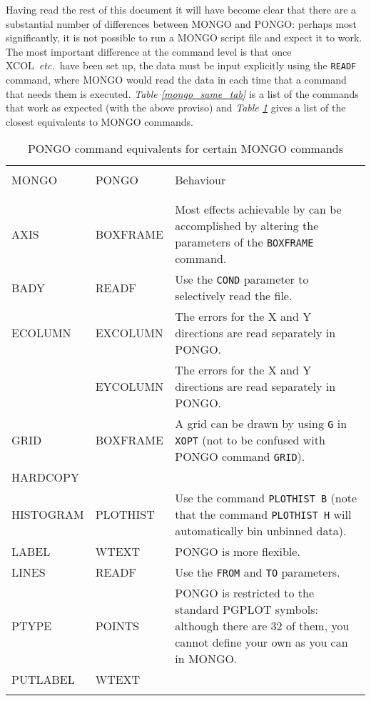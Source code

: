 \documentclass[twoside,11pt]{article}
\newcommand{\htmlref}[2]{#1}
\renewcommand{\_}{\texttt{\symbol{95}}}
\newcommand{\etc}{{\em etc.}}
\newcommand{\xcol}{{\sf XCOL}}
\newcommand{\pnam}[1]{{\tt #1}}
\newcommand{\cnam}[1]{{\tt #1}}
\newcommand{\iref} [1]{\htmlref{#1}{#1}}
\begin{document}
Having read the rest of this document it will have become clear that there
are a substantial number of differences between MONGO and PONGO: perhaps
most significantly, it is not possible to run a MONGO script file and expect it
to work.
The most important difference at the command level is that once
\xcol\ \etc\ have been set up, the data must be input explicitly using the
\cnam{\iref{READF}} command, where MONGO would read the data in each time that a
command that needs them is executed.
{\em Table \ref{mongo_same_tab}} is a list of the commands that work as
expected (with the above proviso) and {\em Table \ref{mongo_diff_tab}} gives a
list of the closest equivalents to MONGO commands.

{\small
\begin{table}
\begin{center}
\begin{tabular}{|l|l|p{}|}
\hline
& & \\
MONGO     & PONGO          & Behaviour \\
& & \\
\hline
& & \\
AXIS      & BOXFRAME       & Most effects achievable by can be  accomplished by
altering the parameters of the \cnam{\iref{BOXFRAME}} command. \\
BADY      & READF          & Use the \pnam{COND} parameter to selectively
read the file. \\
ECOLUMN   & EXCOLUMN       & The errors for the X and Y directions are read
separately in PONGO. \\
          & EYCOLUMN       & The errors for the X and Y directions are read
separately in PONGO. \\
GRID      & BOXFRAME       & A grid can be drawn by using \verb+G+ in
\pnam{XOPT} (not to be confused with PONGO command \cnam{\iref{GRID}}). \\
HARDCOPY  & & \\
HISTOGRAM & PLOTHIST       & Use the command \cnam{\iref{PLOTHIST} B} (note that the
command \cnam{\iref{PLOTHIST} H} will automatically bin unbinned data). \\
LABEL     & WTEXT          & PONGO is more flexible. \\
LINES     & READF          & Use the \pnam{FROM} and \pnam{TO} parameters. \\
PTYPE     & POINTS         & PONGO is restricted to the
standard PGPLOT symbols: although there are 32 of them, you cannot define your
own as you can in MONGO. \\
PUTLABEL  & WTEXT & \\
& & \\ \hline
\end{tabular}
\end{center}
\caption{PONGO command equivalents for certain MONGO commands}
\label{mongo_diff_tab}
\end{table}
}
\end{document}
